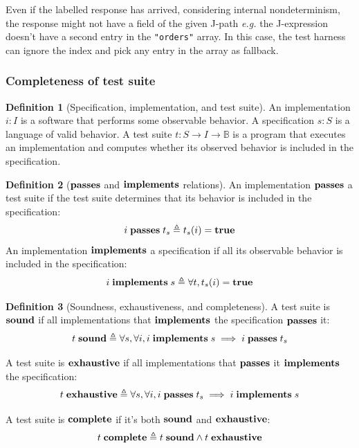 \documentclass{article}
\newcommand{\ilj}[1]{\lstinline[style=json]{#1}}
\theoremstyle{definition}
\newtheorem{definition}{Definition}
\newcommand{\bool}{\mathbb B}
\newcommand{\true}{\ottkw{true}}
\newcommand{\imp}{\ottkw{implements}}
\newcommand{\pass}{\ottkw{passes}}
\newcommand{\sound}{\ottkw{sound}}
\newcommand{\exhaust}{\ottkw{exhaustive}}
\newcommand{\complete}{\ottkw{complete}}
\newcommand{\defeq}{\triangleq}
\newcommand{\implements}[2]{#1\;\imp\;#2}
\newcommand{\passes}[2]{#1\;\pass\;#2}
\newcommand{\issound}[1]{#1\;\sound}
\newcommand{\isexhaust}[1]{#1\;\exhaust}
\newcommand{\iscomplete}[1]{#1\;\complete}
\begin{document}
Even if the labelled response has arrived, considering internal nondeterminism,
the response might not have a field of the given J-path {\it e.g.}  the
J-expression doesn't have a second entry in the \ilj{"orders"} array.  In this
case, the test harness can ignore the index and pick any entry in the array as
fallback.

\subsubsection{Completeness of test suite}

\begin{definition}[Specification, implementation, and test suite]
  An implementation $i:I$ is a software that performs some observable behavior.
  A specification $s:S$ is a language of valid behavior.  A test suite $t:S\to
  I\to\bool$ is a program that executes an implementation and computes whether
  its observed behavior is included in the specification.
\end{definition}

\begin{definition}[$\pass$ and $\imp$ relations]
  An implementation $\pass$ a test suite if the test suite determines that its
  behavior is included in the specification:
  \[ \passes{i}{t_s}\defeq t_s(i)=\true \]
  An implementation $\imp$ a specification if all its observable behavior is
  included in the specification:
  \[ \implements{i}{s}\defeq\forall t,t_s(i)=\true \]
\end{definition}

\begin{definition}[Soundness, exhaustiveness, and completeness]
  A test suite is $\sound$ if all implementations that $\imp$ the specification
  $\pass$ it:
  \[ \issound{t}\defeq\forall s,\forall i,
  \implements{i}{s}\implies\passes{i}{t_s} \]

  A test suite is $\exhaust$ if all implementations that $\pass$ it $\imp$ the
  specification:
  \[ \isexhaust{t}\defeq\forall s,\forall i,
  \passes{i}{t_s}\implies\implements{i}{s} \]

  A test suite is $\complete$ if it's both $\sound$ and $\exhaust$:
  \[ \iscomplete{t}\defeq\issound{t}\wedge\isexhaust{t} \]
\end{definition}
\end{document}
